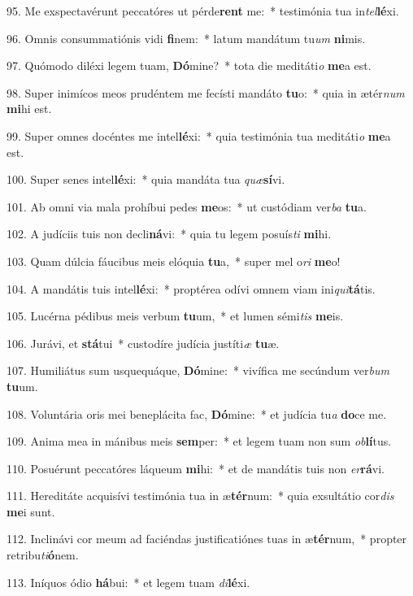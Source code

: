 95. Me exspectavérunt peccatóres ut pérde\textbf{rent} me:~*  testimónia tua in\textit{tel}\textbf{lé}xi.\

96. Omnis consummatiónis vidi \textbf{fi}nem:~*  latum mandátum tu\textit{um} \textbf{ni}mis.\

97. Quómodo diléxi legem tuam, \textbf{Dó}mine?~*  tota die meditáti\textit{o} \textbf{me}a est.\

98. Super inimícos meos prudéntem me fecísti mandáto \textbf{tu}o:~*  quia in ætér\textit{num} \textbf{mi}hi est.\

99. Super omnes docéntes me intel\textbf{lé}xi:~*  quia testimónia tua meditáti\textit{o} \textbf{me}a est.\

100. Super senes intel\textbf{lé}xi:~*  quia mandáta tua \textit{quæ}\textbf{sí}vi.\

101. Ab omni via mala prohíbui pedes \textbf{me}os:~*  ut custódiam ver\textit{ba} \textbf{tu}a.\

102. A judíciis tuis non decli\textbf{ná}vi:~*  quia tu legem posuís\textit{ti} \textbf{mi}hi.\

103. Quam dúlcia fáucibus meis elóquia \textbf{tu}a,~*  super mel o\textit{ri} \textbf{me}o!\

104. A mandátis tuis intel\textbf{lé}xi:~*  proptérea odívi omnem viam ini\textit{qui}\textbf{tá}tis.\

105. Lucérna pédibus meis verbum \textbf{tu}um,~*  et lumen sémi\textit{tis} \textbf{me}is.\

106. Jurávi, et \textbf{stá}tui~*  custodíre judícia justíti\textit{æ} \textbf{tu}æ.\

107. Humiliátus sum usquequáque, \textbf{Dó}mine:~*  vivífica me secúndum ver\textit{bum} \textbf{tu}um.\

108. Voluntária oris mei beneplácita fac, \textbf{Dó}mine:~*  et judícia tu\textit{a} \textbf{do}ce me.\

109. Anima mea in mánibus meis \textbf{sem}per:~*  et legem tuam non sum \textit{ob}\textbf{lí}tus.\

110. Posuérunt peccatóres láqueum \textbf{mi}hi:~*  et de mandátis tuis non \textit{er}\textbf{rá}vi.\

111. Hereditáte acquisívi testimónia tua in æ\textbf{tér}num:~*  quia exsultátio cor\textit{dis} \textbf{me}i sunt.\

112. Inclinávi cor meum ad faciéndas justificatiónes tuas in æ\textbf{tér}num,~*  propter retribu\textit{ti}\textbf{ó}nem.\

113. Iníquos ódio \textbf{há}bui:~*  et legem tuam \textit{di}\textbf{lé}xi.\

